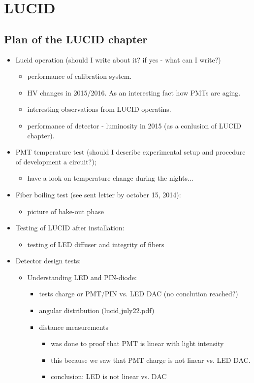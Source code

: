 \chapter{LUCID}
\label{chap:LUCID}

\section{Plan of the LUCID chapter}

\begin{itemize}
 \item Lucid operation (should I write about it? if yes - what can I write?)
 \begin{itemize}
  \item performance of calibration system.
  \item HV changes in 2015/2016. As an interesting fact how PMTs are aging.
  \item interesting observations from LUCID operatins.
  \item performance of detector - luminosity in 2015 (as a conlusion of LUCID chapter).
 \end{itemize}
 
 \item PMT temperature test (should I describe experimental setup and procedure of development a circuit?);
 \begin{itemize}
  \item have a look on temperature change during the nights...
 \end{itemize}

 \item Fiber boiling test (see sent letter by october 15, 2014):
 \begin{itemize}
  \item picture of bake-out phase
 \end{itemize}
 
 \item Testing of LUCID after installation:
 \begin{itemize}
  \item testing of LED diffuser and integrity of fibers
 \end{itemize}
 
 \item Detector design tests:
 \begin{itemize}
  \item Understanding LED and PIN-diode:
  \begin{itemize}
   \item tests charge or PMT/PIN vs. LED DAC (no conclution reached?)
   \item angular distribution (lucid$\_$july22.pdf)
   \item distance measurements 
   \begin{itemize}
    \item was done to proof that PMT is linear with light intensity
    \item this because we saw that PMT charge is not linear vs. LED DAC.
    \item conclusion: LED is not linear vs. DAC
   \end{itemize}
   

\end{itemize}
\end{itemize}
\end{itemize}
